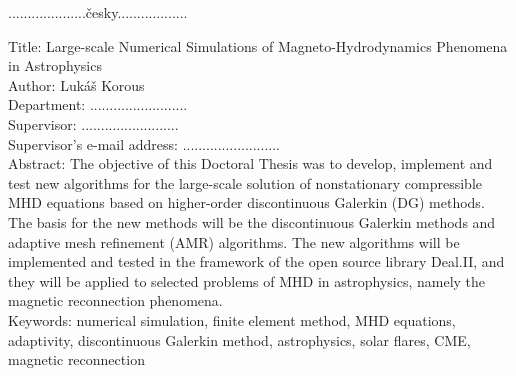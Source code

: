 \normalsize
\setcounter{page}{1}
\tableofcontents

\newpage

\noindent
....................česky..................
\vspace{10mm}

\noindent
Title: Large-scale Numerical Simulations of Magneto-Hydrodynamics Phenomena in Astrophysics\\
Author: Lukáš Korous\\
Department: .........................\\
Supervisor: .........................\\
Supervisor's e-mail address: .........................\\

\noindent Abstract:
The objective of this Doctoral Thesis was to develop, implement and test new algorithms for the large-scale solution of nonstationary compressible MHD equations based on higher-order discontinuous Galerkin (DG) methods. The basis for the new methods will be the discontinuous Galerkin methods and adaptive mesh refinement (AMR) algorithms. The new algorithms will be implemented and tested in the framework of the open source library Deal.II, and they will be applied to selected problems of MHD in astrophysics, namely the magnetic reconnection phenomena. \\

\noindent Keywords: numerical simulation, finite element method, MHD equations, adaptivity, discontinuous Galerkin method, astrophysics, solar flares, CME, magnetic reconnection

\newpage

